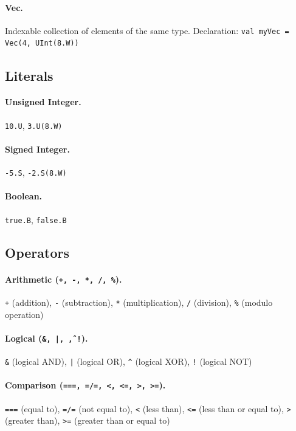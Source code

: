 \paragraph{Vec.} Indexable collection of elements of the same type. Declaration: \texttt{val myVec = Vec(4, UInt(8.W))}

\subsection{Literals} 
\paragraph{Unsigned Integer.}  \texttt{10.U}, \texttt{3.U(8.W)}

\paragraph{Signed Integer.} \texttt{-5.S}, \texttt{-2.S(8.W)}

\paragraph{Boolean.} \texttt{true.B}, \texttt{false.B}

\subsection{Operators} 
\paragraph{Arithmetic (\texttt{+, -, *, /, \%}).} \texttt{+} (addition), \texttt{-} (subtraction), \texttt{*} (multiplication), \texttt{/} (division), \texttt{\%} (modulo operation)

\paragraph{Logical (\texttt{\&, |, \^, !}).} \texttt{\&} (logical AND), \texttt{|} (logical OR), \texttt{\^{}} (logical XOR), \texttt{!} (logical NOT)

\paragraph{Comparison (\texttt{===, =/=, <, <=, >, >=}).} \texttt{===} (equal to), \texttt{=/=} (not equal to), \texttt{<} (less than), \texttt{<=} (less than or equal to), \texttt{>} (greater than), \texttt{>=} (greater than or equal to)

